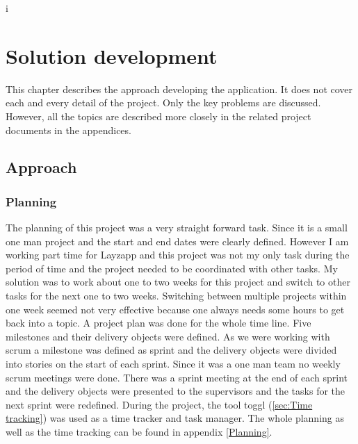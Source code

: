 i%

\chapter{Solution development} %

\label{Solution development} %



This chapter describes the approach developing the application. It does not cover each and every detail of the project. Only the key problems are discussed. However, all the topics are described more closely in the related project documents in the appendices.

\section{Approach}

\subsection{Planning}

The planning of this project was a very straight forward task. Since it is a small one man project and the start and end dates were clearly defined.  However I am working part time for Layzapp and this project was not my only task during the period of time and the project needed to be coordinated with other tasks. My solution was to work about one to two weeks for this project and switch to other tasks for the next one to two weeks. Switching between multiple projects within one week seemed not very effective because one always needs some hours to get back into a topic. \linebreak
A project plan was done for the whole time line. Five milestones and their delivery objects were defined. As we were working with scrum a milestone was defined as sprint and the delivery objects were divided into stories on the start of each sprint. Since it was a one man team no weekly scrum meetings were done. There was a sprint meeting at the end of each sprint and the delivery objects were presented to the supervisors and the tasks for the next sprint were redefined. During the project, the tool toggl (\ref{sec:Time tracking}) was used as a time tracker and task manager. The whole planning as well as the time tracking can be found in appendix \ref{Planning}.

